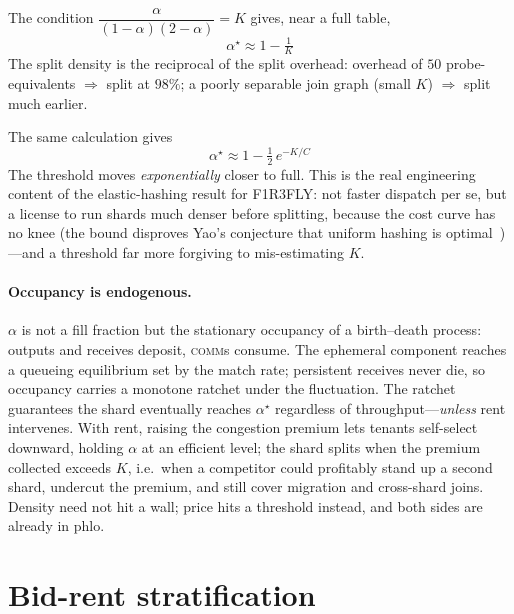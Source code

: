 \documentclass[11pt]{article}
\begin{document}
\begin{description}[leftmargin=0pt,labelsep=0.6em]
  \item[\textnormal{\emph{Conventional open addressing,} $c(\alpha)=\tfrac{1}{1-\alpha}$.}] The condition $\dfrac{\alpha}{(1-\alpha)(2-\alpha)}=K$ gives, near a full table,
  \[
    \boxed{\;\alpha^\star \approx 1-\tfrac{1}{K}\;}
  \]
  The split density is the reciprocal of the split overhead: overhead of $50$ probe-equivalents $\Rightarrow$ split at $98\%$; a poorly separable join graph (small $K$) $\Rightarrow$ split much earlier.

  \item[\textnormal{\emph{Elastic hashing} (Farach-Colton--Krapivin--Kuszmaul~\cite{fkk2025})\textnormal{,} $c(\alpha)=C\log\tfrac{1}{1-\alpha}$.}] The same calculation gives
  \[
    \boxed{\;\alpha^\star \approx 1-\tfrac{1}{2}\,e^{-K/C}\;}
  \]
  The threshold moves \emph{exponentially} closer to full. This is the real engineering content of the elastic-hashing result for F1R3FLY: not faster dispatch per se, but a license to run shards much denser before splitting, because the cost curve has no knee (the bound disproves Yao's conjecture that uniform hashing is optimal~\cite{yao1985})---and a threshold far more forgiving to mis-estimating $K$.
\end{description}

\paragraph{Occupancy is endogenous.} $\alpha$ is not a fill fraction but the stationary occupancy of a birth--death process: outputs and receives deposit, \textsc{comm}s consume. The ephemeral component reaches a queueing equilibrium set by the match rate; persistent receives never die, so occupancy carries a monotone ratchet under the fluctuation. The ratchet guarantees the shard eventually reaches $\alpha^\star$ regardless of throughput---\emph{unless} rent intervenes. With rent, raising the congestion premium lets tenants self-select downward, holding $\alpha$ at an efficient level; the shard splits when the premium collected exceeds $K$, i.e.\ when a competitor could profitably stand up a second shard, undercut the premium, and still cover migration and cross-shard joins. Density need not hit a wall; price hits a threshold instead, and both sides are already in phlo.

\section{Bid-rent stratification}
\label{sec:bidrent}
\end{document}
